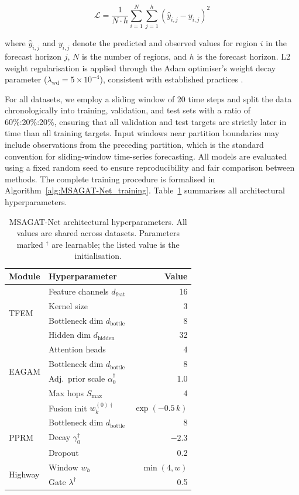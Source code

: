\documentclass[final,1p,times]{elsarticle}
\begin{document}
\begin{equation}
\label{eq:total_loss}
\mathcal{L} = \frac{1}{N \cdot h} \sum_{i=1}^{N} \sum_{j=1}^{h} (\hat{y}_{i,j} - y_{i,j})^2
\end{equation}

where $\hat{y}_{i,j}$ and $y_{i,j}$ denote the predicted and observed values for region $i$ in the forecast horizon $j$, $N$ is the number of regions, and $h$ is the forecast horizon. L2 weight regularisation is applied through the Adam optimiser's weight decay parameter ($\lambda_{\text{wd}} = 5 \times 10^{-4}$), consistent with established practices \cite{velickovic2017graph, zhang2019spatial, xie2022epignn, dengColaGNNCrosslocationAttention2020a}.

For all datasets, we employ a sliding window of 20 time steps and split the data chronologically into training, validation, and test sets with a ratio of 60\%:20\%:20\%, ensuring that all validation and test targets are strictly later in time than all training targets. Input windows near partition boundaries may include observations from the preceding partition, which is the standard convention for sliding-window time-series forecasting. All models are evaluated using a fixed random seed to ensure reproducibility and fair comparison between methods. The complete training procedure is formalised in Algorithm~\ref{alg:MSAGAT-Net_training}. Table~\ref{tab:hyperparameters} summarises all architectural hyperparameters.

\begin{table}[!htbp]
\centering
\caption{MSAGAT-Net architectural hyperparameters. All values are shared across datasets. Parameters marked $^\dagger$ are learnable; the listed value is the initialisation.}
\label{tab:hyperparameters}
\begin{tabular}{@{}llr@{}}
\toprule
\textbf{Module} & \textbf{Hyperparameter} & \textbf{Value} \\
\midrule
\multirow{4}{*}{TFEM}
 & Feature channels $d_{\text{feat}}$ & 16 \\
 & Kernel size & 3 \\
 & Bottleneck dim $d_{\text{bottle}}$ & 8 \\
 & Hidden dim $d_{\text{hidden}}$ & 32 \\
\midrule
\multirow{4}{*}{EAGAM}
 & Attention heads & 4 \\
 & Bottleneck dim $d_{\text{bottle}}$ & 8 \\
 & Adj.\ prior scale $\alpha_0^{\dagger}$ & 1.0 \\
\midrule
\multirow{2}{*}{MSSFM}
 & Max hops $S_{\max}$ & 4 \\
 & Fusion init $w_k^{(0)\dagger}$ & $\exp(-0.5\,k)$ \\
\midrule
\multirow{3}{*}{PPRM}
 & Bottleneck dim $d_{\text{bottle}}$ & 8 \\
 & Decay $\gamma_0^{\dagger}$ & $-2.3$ \\
 & Dropout & 0.2 \\
\midrule
\multirow{2}{*}{Highway}
 & Window $w_h$ & $\min(4, w)$ \\
 & Gate $\lambda^{\dagger}$ & 0.5 \\
\bottomrule
\end{tabular}
\end{table}
\end{document}
